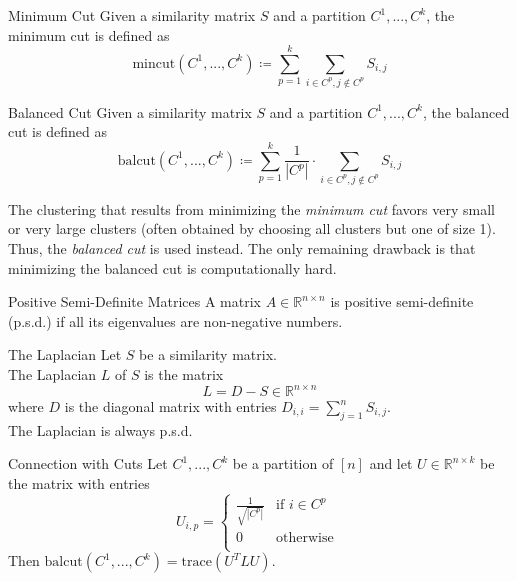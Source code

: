 \documentclass[english]{panikzettel}
\begin{document}
\begin{halfboxl}
\vspace{-\baselineskip}
	\begin{defi}{Minimum Cut}
		Given a similarity matrix $S$ and a partition $C^1,..., C^k$, the minimum cut is defined as
		\[
		\text{mincut}(C^1,...,C^k)\coloneqq \sum_{p=1}^k \sum_{i\in C^p, j\notin C^p} S_{i,j}
		\]
	\end{defi}
\end{halfboxl}
\begin{halfboxr}
\vspace{-\baselineskip}

	\begin{defi}{Balanced Cut}
		Given a similarity matrix $S$ and a partition $C^1,..., C^k$, the balanced cut is defined as
		\[
		\text{balcut}(C^1,..., C^k)\coloneqq \sum_{p=1}^k \frac{1}{|C^p|}\cdot \sum_{i\in C^p, j\notin C^p} S_{i,j}
		\]
	\end{defi}
	
\end{halfboxr}

The clustering that results from minimizing the \emph{minimum cut} favors very small or very large clusters (often obtained by choosing all clusters but one of size 1). Thus, the \emph{balanced cut} is used instead. The only remaining drawback is that minimizing the balanced cut is computationally hard.


\begin{defi}{Positive Semi-Definite Matrices}
A matrix $A\in\mathbb{R}^{n\times n}$ is positive semi-definite (p.s.d.) if all its eigenvalues are non-negative numbers.
\end{defi}

\begin{halfboxl}
\vspace{-\baselineskip}
	\begin{defi}{The Laplacian}
	Let $S$ be a similarity matrix. \\
	The Laplacian $L$ of $S$ is the matrix
	\[
	L=D-S\in \mathbb{R}^{n\times n}
	\]
	where $D$ is the diagonal matrix with entries $D_{i,i}=\sum_{j=1}^n S_{i,j}$.\\
	The Laplacian is always p.s.d.
	\end{defi}
\end{halfboxl}
\begin{halfboxr}
\vspace{-\baselineskip}
	\begin{theo}{Connection with Cuts}
	Let $C^1, ..., C^k$ be a partition of $[n]$ and let $U\in\mathbb{R}^{n\times k}$ be the matrix with entries
	\[
	U_{i,p}=
	\begin{cases}
	\frac{1}{\sqrt{|C^p|}} & \text{if } i\in C^p \\
	0 & \text{otherwise } \\
	\end{cases}
	\]
	Then $\text{balcut}(C^1,...,C^k)=\text{trace}(U^TLU)$.
	\end{theo}
\end{halfboxr}
\end{document}
